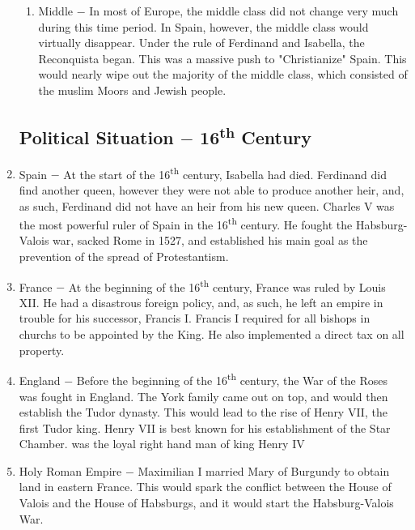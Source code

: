 \documentclass[12pt]{article}
\begin{document}
\begin{enumerate}
\begin{enumerate}[label=\arabic{*}.]
\item Middle $-$ In most of Europe, the middle class did not change very much during this time period. In Spain, however, the middle class would virtually disappear. Under the rule of Ferdinand and Isabella, the Reconquista began. This was a massive push to "Christianize" Spain. This would nearly wipe out the majority of the middle class, which consisted of the muslim Moors and Jewish people.

\end{enumerate}

\subsection{Political Situation $-$ 16\textsuperscript{th} Century}

\setcounter{enumi}{39}

\item Spain $-$ At the start of the 16\textsuperscript{th} century, Isabella had died. Ferdinand did find another queen, however they were not able to produce another heir, and, as such, Ferdinand did not have an heir from his new queen. Charles V was the most powerful ruler of Spain in the 16\textsuperscript{th} century. He fought the Habsburg-Valois war, sacked Rome in 1527, and established his main goal as the prevention of the spread of Protestantism.

\item France $-$ At the beginning of the 16\textsuperscript{th} century, France was ruled by Louis XII. He had a disastrous foreign policy, and, as such, he left an empire in trouble for his successor, Francis I. Francis I required for all bishops in churchs to be appointed by the King. He also implemented a direct tax on all property. 

\item England $-$ Before the beginning of the 16\textsuperscript{th} century, the War of the Roses was fought in England. The York family came out on top, and would then establish the Tudor dynasty. This would lead to the rise of Henry VII, the first Tudor king. Henry VII is best known for his establishment of the Star Chamber.  was the loyal right hand man of king Henry IV

\item Holy Roman Empire $-$ Maximilian I married Mary of Burgundy to obtain land in eastern France. This would spark the conflict between the House of Valois and the House of Habsburgs, and it would start the Habsburg-Valois War.


\end{enumerate}
\end{document}
